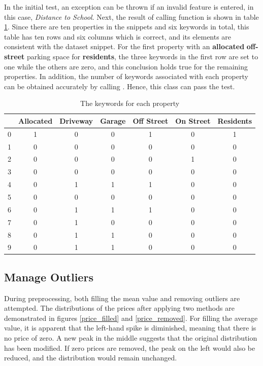 \documentclass[12pt,twoside]{report}
\begin{document}
In the initial test, an exception can be thrown if an invalid feature is entered, in this case, \textit{Distance to School}. Next, the result of calling function  is shown in table \ref{parking_types}. Since there are ten properties in the snippets and six keywords in total, this table has ten rows and six columns which is correct, and its elements are consistent with the dataset snippet. For the first property with an \textbf{allocated} \textbf{off-street} parking space for \textbf{residents}, the three keywords in the first row are set to one while the others are zero, and this conclusion holds true for the remaining properties. In addition, the number of keywords associated with each property can be obtained accurately by calling . Hence, this class can pass the test. 

\begin{table}[!htbp]
	\centering
	\caption{The keywords for each property}
	\label{parking_types}
	\begin{tabular}{| c | c | c | c | c | c | c |}
		\hline
		& Allocated & Driveway & Garage & Off Street & On Street & Residents\\
		\hline
		0 & 1 & 0 & 0 & 1 & 0 & 1 \\ 
		\hline
		1 & 0 & 0 & 0 & 0 & 0 & 0 \\
		\hline
		2 & 0 & 0 & 0 & 0 & 1 & 0 \\
		\hline
		3 & 0 & 0 & 0 & 0 & 0 & 0 \\
		\hline
		4 & 0 & 1 & 1 & 1 & 0 & 0 \\
		\hline
		5 & 0 & 0 & 0 & 0 & 0 & 0 \\
		\hline
		6 & 0 & 1 & 1 & 1 & 0 & 0 \\
		\hline
		7 & 0 & 1 & 0 & 0 & 0 & 0 \\
		\hline
		8 & 0 & 1 & 1 & 0 & 0 & 0 \\
		\hline
		9 & 0 & 1 & 1 & 0 & 0 & 0 \\
		\hline
	\end{tabular}
\end{table}

\subsection{Manage Outliers}
During preprocessing, both filling the mean value and removing outliers are attempted. The distributions of the prices after applying two methods are demonstrated in figures \ref{price_filled} and \ref{price_removed}. For filling the average value, it is apparent that the left-hand spike is diminished, meaning that there is no price of zero. A new peak in the middle suggests that the original distribution has been modified. If zero prices are removed, the peak on the left would also be reduced, and the distribution would remain unchanged. 
\\
\end{document}

